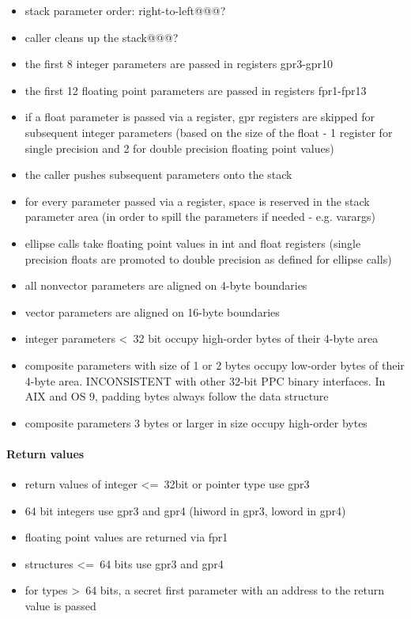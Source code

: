 \begin{itemize}
\item stack parameter order: right-to-left@@@?
\item caller cleans up the stack@@@?
\item the first 8 integer parameters are passed in registers gpr3-gpr10
\item the first 12 floating point parameters are passed in registers fpr1-fpr13
\item if a float parameter is passed via a register, gpr registers are skipped for subsequent integer parameters (based on the size of
the float - 1 register for single precision and 2 for double precision floating point values)
\item the caller pushes subsequent parameters onto the stack
\item for every parameter passed via a register, space is reserved in the stack parameter area (in order to spill the parameters if
needed - e.g. varargs)
\item ellipse calls take floating point values in int and float registers (single precision floats are promoted to double precision
as defined for ellipse calls)
\item all nonvector parameters are aligned on 4-byte boundaries
\item vector parameters are aligned on 16-byte boundaries
\item integer parameters \textless\ 32 bit occupy high-order bytes of their 4-byte area
\item composite parameters with size of 1 or 2 bytes occupy low-order bytes of their 4-byte area. INCONSISTENT with other 32-bit PPC
binary interfaces. In AIX and OS 9, padding bytes always follow the data structure
\item composite parameters 3 bytes or larger in size occupy high-order bytes
\end{itemize}


\paragraph{Return values}

\begin{itemize}
\item return values of integer \textless=\ 32bit or pointer type use gpr3
\item 64 bit integers use gpr3 and gpr4 (hiword in gpr3, loword in gpr4)
\item floating point values are returned via fpr1
\item structures \textless=\ 64 bits use gpr3 and gpr4
\item for types \textgreater\ 64 bits, a secret first parameter with an address to the return value is passed
\end{itemize}


